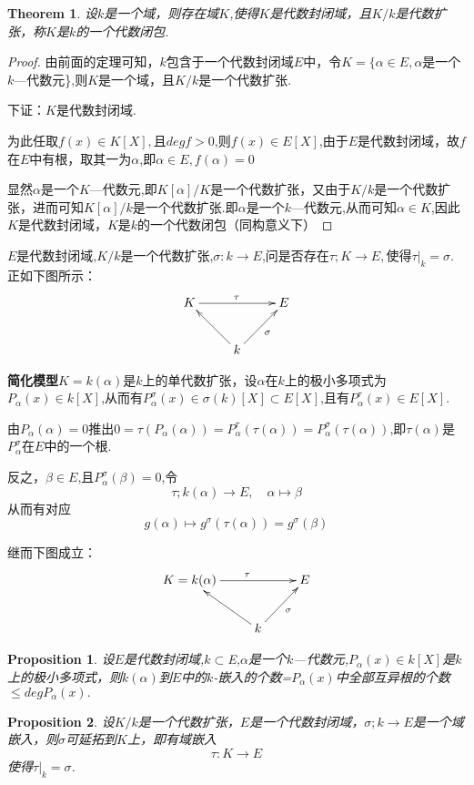 \documentclass[UTF8]{article}
\newtheorem{thm}{Theorem}[section]
\newtheorem{prop}{Proposition}[section]
\begin{document}
\begin{thm}
 设$k$是一个域，则存在域$K$,使得$K$是代数封闭域，且$K/k$是代数扩张，称$K$是$k$的一个代数闭包.
\end{thm}
\begin{proof}
由前面的定理可知，$k$包含于一个代数封闭域$E$中，令$K=\{\alpha \in E,\alpha$是一个$k$—代数元\},则$K$是一个域，且$K/k$是一个代数扩张.

下证：$K$是代数封闭域.

为此任取$f(x)\in K[X],$且$degf>0$,则$f(x)\in E[X]$,由于$E$是代数封闭域，故$f$在$E$中有根，取其一为$\alpha$,即$\alpha\in E,f(\alpha)=0$

显然$\alpha$是一个$K$—代数元,即$K[\alpha]/K$是一个代数扩张，又由于$K/k$是一个代数扩张，进而可知$K[\alpha]/k$是一个代数扩张.即$\alpha$是一个$k$—代数元,从而可知$\alpha\in K$,因此$K$是代数封闭域，$K$是$k$的一个代数闭包（同构意义下）
\end{proof}

$E$是代数封闭域,$K/k$是一个代数扩张,$\sigma : k\rightarrow E$,问是否存在$\tau ; K\rightarrow E,$使得$\tau |_k=\sigma$.正如下图所示：
$$\xymatrix{K\ar[rr]^{\tau}&&{E}\\& k\ar[lu] \ar[ru]_{\sigma} & }$$

\textbf{简化模型}\quad $K=k(\alpha)$是$k$上的单代数扩张，设$\alpha$在$k$上的极小多项式为$P_{\alpha}(x)\in k[X]$,从而有$P_{\alpha}^{\sigma }(x)\in \sigma(k)[X]\subset E[X]$,且有$P_{\alpha}^{\tau}(x)\in E[X].$ 

由$P_{\alpha}(\alpha)=0$推出$0=\tau(P_{\alpha}(\alpha))= P_{\alpha}^{\tau}(\tau(\alpha))=P_{\alpha}^{\sigma }(\tau(\alpha))$,即$\tau(\alpha)$是$P_{\alpha}^{\sigma }$在$E$中的一个根.

反之，$\beta\in E$,且$P_{\alpha}^{\sigma }(\beta)=0$,令$$\tau ; k(\alpha)\rightarrow E,\quad \alpha\longmapsto \beta$$从而有对应$$g(\alpha)\longmapsto g^{\sigma }(\tau(\alpha))= g^{\sigma }(\beta)$$

继而下图成立：
$$\xymatrix{K=k(\alpha)\ar[rr]^{\tau}&&{E}\\& k\ar[lu] \ar[ru]_{\sigma} & }$$

\begin{prop} 设$E$是代数封闭域,$k\subset $E,$\alpha$是一个$k$—代数元,$P_{\alpha}(x)\in k[X]$是$k$上的极小多项式，则$k(\alpha)$到$E$中的$k$-嵌入的个数=$P_{\alpha}(x)$中全部互异根的个数$\le degP_{\alpha}(x).$
	\end{prop}
\begin{prop}
 设$K/k$是一个代数扩张，$E$是一个代数封闭域，$\sigma; k\rightarrow E$是一个域嵌入，则$\sigma$可延拓到$K$上，即有域嵌入$$\tau :K\rightarrow E$$使得$\tau |_k=\sigma$.
\end{prop}
\end{document}
